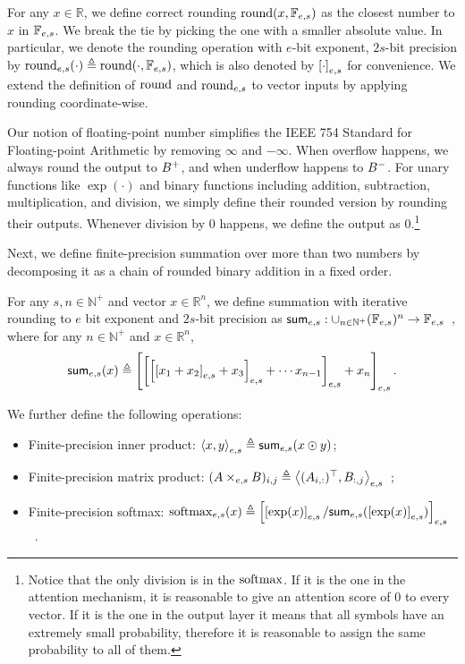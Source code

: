 \begin{definition}\label{defi:rounding} 
For any $x\in \mathbb{R}$, we define correct rounding $\mathrm{round}(x, \mathbb{F}_{e,s})$ as the closest number to $x$ in $\mathbb{F}_{e,s}$. We break the tie by picking the one with a smaller absolute value. 
In particular, we denote the rounding operation with $e$-bit exponent, $2s$-bit precision by $\mathrm{round}_{e,s}(\cdot)\triangleq \mathrm{round}(\cdot,\mathbb{F}_{e,s})$, which is also denoted by $\left[\cdot\right]_{e,s}$ for convenience. We extend the definition of $\mathrm{round}$ and $\mathrm{round}_{e,s}$ to vector inputs by applying rounding coordinate-wise.
\end{definition} 


Our notion of floating-point number simplifies the IEEE 754 Standard for Floating-point Arithmetic \citep{ieee754_2008} by removing $\infty$ and $-\infty$. When overflow happens, we always round the output to $B^{+}$, and when underflow happens to $B^{-}$. For unary functions like $\exp(\cdot)$ and binary functions including addition, subtraction, multiplication, and division, we simply define their rounded version by rounding their outputs. Whenever division by $0$ happens, we define the output as $0$.\footnote{Notice that the only division is in the $\mathrm{softmax}$. If it is the one in the attention mechanism, it is reasonable to give an attention score of $0$ to every vector. If it is the one in the output layer it means that all symbols have an extremely small probability, therefore it is reasonable to assign the same probability to all of them.}


Next, we define finite-precision summation over more than two numbers by decomposing it as a chain of rounded binary addition in a fixed order.

\begin{definition} For any $s,n\in\mathbb{N}^+$ and vector $x \in \mathbb{R}^n$, we define summation with iterative rounding to $e$ bit exponent and $2s$-bit precision as $\mathsf{sum}_{e,s}:\cup_{n\in\mathbb{N}^+}(\mathbb{F}_{e,s})^n\to \mathbb{F}_{e,s}$\ , where for any $n\in\mathbb{N}^+$ and $x\in\mathbb{R}^n$, $$\mathsf{sum}_{e,s}(x)\triangleq \left[\left[\left[\left[x_1+x_2\right]_{e,s}+x_3\right]_{e,s}+\cdots x_{n-1}\right]_{e,s}+x_n\right]_{e,s}.$$

We further define the following operations:
\begin{itemize}
	\item Finite-precision inner product: $\left\langle x,y \right\rangle_{e,s}\triangleq \mathsf{sum}_{e,s}(x\odot y)$;
	\item Finite-precision matrix product: $(A\times_{e,s} B)_{i,j} \triangleq \left\langle (A_{i,:})^\top,B_{:,j} \right\rangle_{e,s}$\ ;
	\item Finite-precision softmax: $\mathrm{softmax}_{e,s}(x)\triangleq \left[\left[\exp(x)\right]_{e,s}/\mathsf{sum}_{e,s}(\left[\exp(x)\right]_{e,s})\right]_{e,s}$\ .
\end{itemize}
\end{definition}


